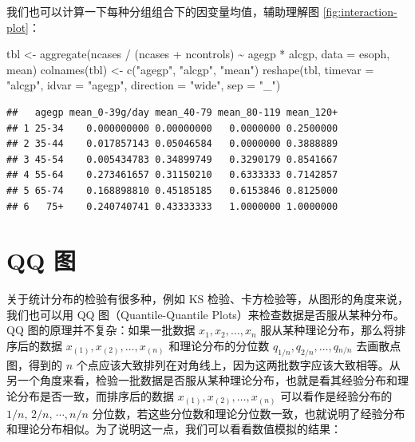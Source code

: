 \documentclass[
  b5paper,
  UTF8,twoside]{book}
\newenvironment{Shaded}{\begin{snugshade}}{\end{snugshade}}
\newcommand{\AttributeTok}[1]{\textcolor[rgb]{0.77,0.63,0.00}{#1}}
\newcommand{\FunctionTok}[1]{\textcolor[rgb]{0.00,0.00,0.00}{#1}}
\newcommand{\NormalTok}[1]{#1}
\newcommand{\OtherTok}[1]{\textcolor[rgb]{0.56,0.35,0.01}{#1}}
\newcommand{\SpecialCharTok}[1]{\textcolor[rgb]{0.00,0.00,0.00}{#1}}
\newcommand{\StringTok}[1]{\textcolor[rgb]{0.31,0.60,0.02}{#1}}
\begin{document}
我们也可以计算一下每种分组组合下的因变量均值，辅助理解图 \ref{fig:interaction-plot}：

\begin{Shaded}
\begin{Highlighting}[]
\NormalTok{tbl }\OtherTok{\textless{}{-}} \FunctionTok{aggregate}\NormalTok{(ncases }\SpecialCharTok{/}\NormalTok{ (ncases }\SpecialCharTok{+}\NormalTok{ ncontrols) }\SpecialCharTok{\textasciitilde{}}\NormalTok{ agegp }\SpecialCharTok{*}\NormalTok{ alcgp, }\AttributeTok{data =}\NormalTok{ esoph, mean)}
\FunctionTok{colnames}\NormalTok{(tbl) }\OtherTok{\textless{}{-}} \FunctionTok{c}\NormalTok{(}\StringTok{"agegp"}\NormalTok{, }\StringTok{"alcgp"}\NormalTok{, }\StringTok{"mean"}\NormalTok{)}
\FunctionTok{reshape}\NormalTok{(tbl, }\AttributeTok{timevar =} \StringTok{"alcgp"}\NormalTok{, }\AttributeTok{idvar =} \StringTok{"agegp"}\NormalTok{, }\AttributeTok{direction =} \StringTok{"wide"}\NormalTok{, }\AttributeTok{sep =} \StringTok{"\_"}\NormalTok{)}
\end{Highlighting}
\end{Shaded}

\begin{verbatim}
##   agegp mean_0-39g/day mean_40-79 mean_80-119 mean_120+
## 1 25-34    0.000000000 0.00000000   0.0000000 0.2500000
## 2 35-44    0.017857143 0.05046584   0.0000000 0.3888889
## 3 45-54    0.005434783 0.34899749   0.3290179 0.8541667
## 4 55-64    0.273461657 0.31150210   0.6333333 0.7142857
## 5 65-74    0.168898810 0.45185185   0.6153846 0.8125000
## 6   75+    0.240740741 0.43333333   1.0000000 1.0000000
\end{verbatim}

\hypertarget{sec:qqplot}{%
\section{QQ 图}\label{sec:qqplot}}

关于统计分布的检验有很多种，例如 KS 检验、卡方检验等，从图形的角度来说，我们也可以用 QQ 图（Quantile-Quantile
Plots）来检查数据是否服从某种分布。QQ 图的原理并不复杂：如果一批数据 \(x_{1},x_{2},\ldots,x_{n}\) 服从某种理论分布，那么将排序后的数据 \(x_{(1)},x_{(2)},\ldots,x_{(n)}\) 和理论分布的分位数 \(q_{1/n},q_{2/n},\ldots,q{}_{n/n}\) 去画散点图，得到的 \(n\) 个点应该大致排列在对角线上，因为这两批数字应该大致相等。从另一个角度来看，检验一批数据是否服从某种理论分布，也就是看其经验分布和理论分布是否一致，而排序后的数据 \(x_{(1)},x_{(2)},\ldots,x_{(n)}\) 可以看作是经验分布的 \(1/n,\,2/n,\,\cdots,n/n\) 分位数，若这些分位数和理论分位数一致，也就说明了经验分布和理论分布相似。为了说明这一点，我们可以看看数值模拟的结果：
\end{document}

